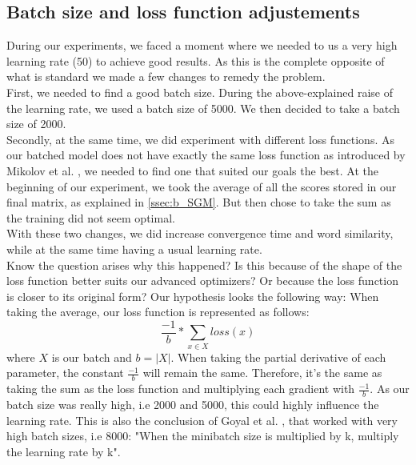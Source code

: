 \subsection{Batch size and loss function adjustements}\label{ssec:bs_lf}
During our experiments, we faced a moment where we needed to us a very high learning rate (50) to achieve good results. As this is the complete opposite of what is standard we made a few changes to remedy the problem.\\
First, we needed to find a good batch size. During the above-explained raise of the learning rate, we used a batch size of 5000. We then decided to take a batch size of 2000.\\
Secondly, at the same time, we did experiment with different loss functions. As our batched model does not have exactly the same loss function as introduced by Mikolov et al. \cite{mikolov}, we needed to find one that suited our goals the best. At the beginning of our experiment, we took the average of all the scores stored in our final matrix, as explained in \ref{ssec:b_SGM}. But then chose to take the sum as the training did not seem optimal.\\
With these two changes, we did increase convergence time and word similarity, while at the same time having a usual learning rate. \\
Know the question arises why this happened? Is this because of the shape of the loss function better suits our advanced optimizers? Or because the loss function is closer to its original form? Our hypothesis looks the following way:
When taking the average, our loss function is represented as follows:
\begin{equation}
\frac{-1}{b }* \sum_{x\in X} loss(x)
\end{equation}
where $X$ is our batch and $b = |X|$.
When taking the partial derivative of each parameter, the constant $ \frac{-1}{b }$ will remain the same. Therefore, it's the same as taking the sum as the loss function and multiplying each gradient with $\frac{-1}{b }$. As our batch size was really high, i.e 2000 and 5000, this could highly influence the learning rate. This is also the conclusion of Goyal et al. \cite{fb}, that worked with very high batch sizes, i.e 8000: "When the minibatch size is multiplied by k, multiply the learning rate by k".

